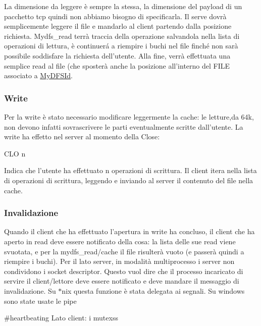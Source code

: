 La dimensione da leggere è sempre la stessa, la dimensione del payload di un pacchetto tcp quindi non abbiamo bisogno di specificarla. Il serve dovrà semplicemente leggere il file e mandarlo al client partendo dalla posizione richiesta. Mydfs\+\_\+read terrà traccia della operazione salvandola nella lista di operazioni di lettura, è continuerá a riempire i buchi nel file finché non sarà possibile soddisfare la richiesta dell'utente. Alla fine, verrà effettuata una semplice read al file (che sposterà anche la posizione all'interno del F\+I\+L\+E associato a \hyperlink{structMyDFSId}{My\+D\+F\+S\+Id}.

\subsubsection*{Write}

Per la write è stato necessario modificare leggermente la cache\+: le letture,da 64k, non devono infatti sovrascrivere le parti eventualmente scritte dall'utente. La write ha effetto nel server al momento della Close\+:

C\+L\+O n

Indica che l'utente ha effettuato n operazioni di scrittura. Il client itera nella lista di operazioni di scrittura, leggendo e inviando al server il contenuto del file nella cache.

\subsubsection*{Invalidazione}

Quando il client che ha effettuato l'apertura in write ha concluso, il client che ha aperto in read deve essere notificato della cosa\+: la lista delle sue read viene svuotata, e per la mydfs\+\_\+read/cache il file risulterà vuoto (e passerà quindi a riempire i buchi). Per il lato server, in modalità multiprocesso i server non condividono i socket descriptor. Questo vuol dire che il processo incaricato di servire il client/lettore deve essere notificato e deve mandare il messaggio di invalidazione. Su $\ast$nix questa funzione è stata delegata ai segnali. Su windows sono state usate le pipe

\#heartbeating Lato client\+: i mutexss 